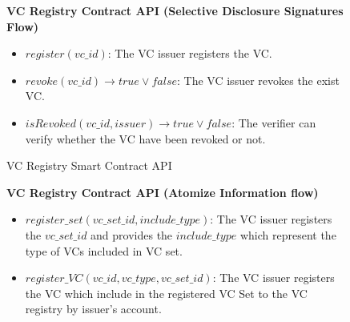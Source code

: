 \documentclass[conference, dvipdfmx]{IEEEtran} %
\begin{document}
\begin{sloppypar}
\begin{figure}[htbp]
  \centering
  \begin{varwidth}{8.5cm}
  \fbox
  {\parbox{\textwidth}
    {
      \begin{center}
        \textbf{VC Registry Contract API (Selective Disclosure Signatures Flow)}
      \end{center}
      \begin{itemize}
        \item $register(vc\_id)$: The VC issuer registers the VC.
        \item $revoke(vc\_id) 	\rightarrow true \lor false$: The VC issuer revokes the exist VC. 
        \item $isRevoked(vc\_id, issuer)  \rightarrow true \lor false$: The verifier can verify whether the VC have been revoked or not. 
      \end{itemize}
    }
  }
  \end{varwidth}
  \caption{VC Registry Smart Contract API}
  \label{fig:VC_Registry_API_sd_flow}
\end{figure}

\begin{figure}[htbp]
  \centering
  \begin{center}
  \begin{varwidth}{8.5cm}
  \fbox
  {\parbox{\textwidth}
    {
      \begin{center}
        \textbf{VC Registry Contract API (Atomize Information flow)}
      \end{center}
      \begin{itemize}
        \item $register\_set(vc\_set\_id, include\_type)$: The VC issuer registers the $vc\_set\_id$ and provides the $include\_type$ which represent the type of VCs included in VC set.
        \item $register\_VC(vc\_id, vc\_type, vc\_set\_id)$: The VC issuer registers the VC which include in the registered VC Set to the VC registry by issuer’s account.
        

\end{itemize}}}
\end{varwidth}
\end{center}
\end{figure}
\end{sloppypar}
\end{document}
